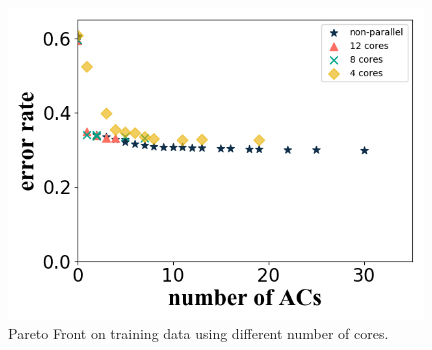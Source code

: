 \documentclass[conference]{IEEEtran}
\begin{document}
\begin{figure}[H]
\begin{minipage}[t]{0.25\textwidth}
    \end{minipage}%
    \centering
    \begin{minipage}[t]{0.25\textwidth}
    \includegraphics[width=0.98\textwidth]{figures/diffCoreTrain3.png}
  
    \end{minipage}
      \caption{Pareto Front on training data using different number of cores.}
    \label{diffCoreTr}
  \end{figure}
\end{document}
